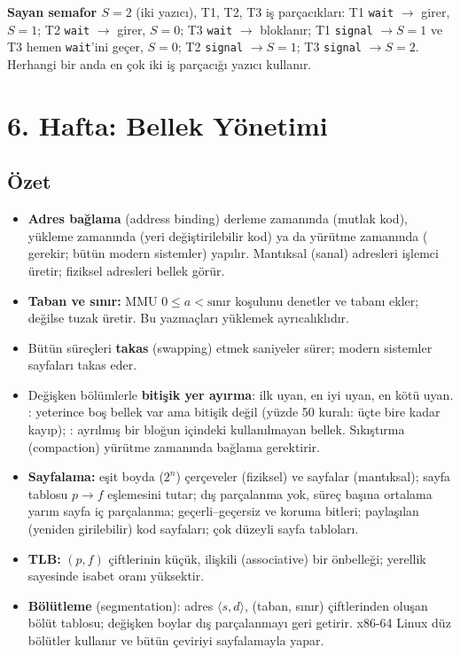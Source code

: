 \textbf{Sayan semafor $S = 2$} (iki yazıcı), T1, T2, T3 iş parçacıkları: T1 \texttt{wait} $\to$ girer, $S=1$; T2 \texttt{wait} $\to$ girer, $S=0$; T3 \texttt{wait} $\to$ bloklanır; T1 \texttt{signal} $\to S=1$ ve T3 hemen \texttt{wait}'ini geçer, $S=0$; T2 \texttt{signal} $\to S=1$; T3 \texttt{signal} $\to S=2$. Herhangi bir anda en çok iki iş parçacığı yazıcı kullanır.

\section{6. Hafta: Bellek Yönetimi}
\label{sec:w6}
\subsection*{Özet}
\begin{itemize}
  \item \textbf{Adres bağlama} (address binding) derleme zamanında (mutlak kod), yükleme zamanında (yeri değiştirilebilir kod) ya da yürütme zamanında ( gerekir; bütün modern sistemler) yapılır. Mantıksal (sanal) adresleri işlemci üretir; fiziksel adresleri bellek görür.
  \item \textbf{Taban ve sınır:} MMU $0 \le a < \text{sınır}$ koşulunu denetler ve tabanı ekler; değilse tuzak üretir. Bu yazmaçları yüklemek ayrıcalıklıdır.
  \item Bütün süreçleri \textbf{takas} (swapping) etmek saniyeler sürer; modern sistemler sayfaları takas eder.
  \item Değişken bölümlerle \textbf{bitişik yer ayırma}: ilk uyan, en iyi uyan, en kötü uyan. : yeterince boş bellek var ama bitişik değil (yüzde 50 kuralı: üçte bire kadar kayıp); : ayrılmış bir bloğun içindeki kullanılmayan bellek. Sıkıştırma (compaction) yürütme zamanında bağlama gerektirir.
  \item \textbf{Sayfalama:} eşit boyda ($2^{n}$) çerçeveler (fiziksel) ve sayfalar (mantıksal); sayfa tablosu $p \to f$ eşlemesini tutar; dış parçalanma yok, süreç başına ortalama yarım sayfa iç parçalanma; geçerli--geçersiz ve koruma bitleri; paylaşılan (yeniden girilebilir) kod sayfaları; çok düzeyli sayfa tabloları.
  \item \textbf{TLB:} $(p, f)$ çiftlerinin küçük, ilişkili (associative) bir önbelleği; yerellik sayesinde isabet oranı yüksektir.
  \item \textbf{Bölütleme} (segmentation): adres $\langle s, d\rangle$, (taban, sınır) çiftlerinden oluşan bölüt tablosu; değişken boylar dış parçalanmayı geri getirir. x86-64 Linux düz bölütler kullanır ve bütün çeviriyi sayfalamayla yapar.
\end{itemize}

